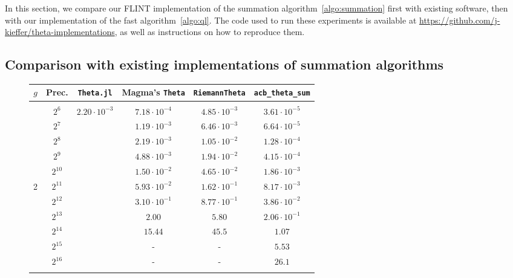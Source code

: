 \documentclass[12pt,oneside]{amsart}
\numberwithin{equation}{section}
\theoremstyle{definition}
\begin{document}
In this section, we compare our FLINT implementation of the summation
algorithm~\ref{algo:summation} first with existing software, then with our
implementation of the fast algorithm~\ref{algo:ql}. The code used to run these
experiments is available at
\url{https://github.com/j-kieffer/theta-implementations}, as well as
instructions on how to reproduce them.


\subsection{Comparison with existing implementations of summation algorithms}
\label{subsec:sum-compare}

\begin{figure}[p]
  \centering
  {\footnotesize
    \begin{tabular}{|c|c|cccc|}
      \hline
      $g$ & Prec. & \texttt{Theta.jl} & Magma's \texttt{Theta} & \texttt{RiemannTheta} & \texttt{acb\_theta\_sum} \\
      \hline & &&&&\\[-1em]
          & $2^6$ & $2.20 \cdot 10^{-3}$ & $7.18\cdot 10^{-4}$ & $4.85\cdot 10^{-3}$ & $3.61 \cdot 10^{-5}$ \\
          & $2^7$ & & $1.19\cdot 10^{-3}$ & $6.46 \cdot 10^{-3}$ & $6.64\cdot 10^{-5}$ \\
          & $2^8$ & & $2.19\cdot 10^{-3}$ & $1.05\cdot 10^{-2}$ & $1.28\cdot 10^{-4}$ \\
          & $2^9$ & & $4.88\cdot 10^{-3}$ & $1.94 \cdot 10^{-2}$ & $4.15\cdot 10^{-4}$ \\
          & $2^{10}$ & & $1.50\cdot 10^{-2}$ & $4.65\cdot 10^{-2}$ & $1.86\cdot 10^{-3}$ \\
      2 & $2^{11}$ & & $5.93\cdot 10^{-2}$ & $1.62\cdot 10^{-1}$ & $8.17\cdot 10^{-3}$\\
          & $2^{12}$ & & $3.10\cdot 10^{-1}$ & $8.77\cdot 10^{-1}$ & $3.86\cdot 10^{-2}$ \\
          & $2^{13}$ & & $2.00$ & $5.80$ & $2.06\cdot 10^{-1}$ \\
          & $2^{14}$ & & $15.44$ & $45.5$ & $1.07$ \\
          & $2^{15}$ & & - & - & $5.53$ \\
          & $2^{16}$ & & - & - & $26.1$ \\ \hline & &&&&\\[-1em]


\end{tabular}}
\end{figure}
\end{document}
